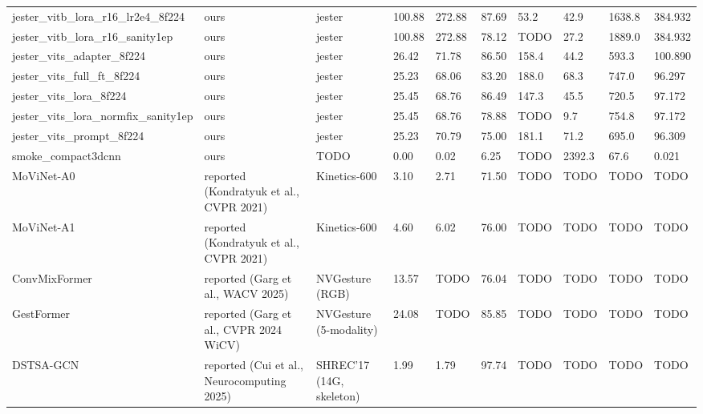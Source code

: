 \begin{tabular}{llllllllll}
jester\_vitb\_lora\_r16\_lr2e4\_8f224 & ours & jester & 100.88 & 272.88 & 87.69 & 53.2 & 42.9 & 1638.8 & 384.932 \\
jester\_vitb\_lora\_r16\_sanity1ep & ours & jester & 100.88 & 272.88 & 78.12 & TODO & 27.2 & 1889.0 & 384.932 \\
jester\_vits\_adapter\_8f224 & ours & jester & 26.42 & 71.78 & 86.50 & 158.4 & 44.2 & 593.3 & 100.890 \\
jester\_vits\_full\_ft\_8f224 & ours & jester & 25.23 & 68.06 & 83.20 & 188.0 & 68.3 & 747.0 & 96.297 \\
jester\_vits\_lora\_8f224 & ours & jester & 25.45 & 68.76 & 86.49 & 147.3 & 45.5 & 720.5 & 97.172 \\
jester\_vits\_lora\_normfix\_sanity1ep & ours & jester & 25.45 & 68.76 & 78.88 & TODO & 9.7 & 754.8 & 97.172 \\
jester\_vits\_prompt\_8f224 & ours & jester & 25.23 & 70.79 & 75.00 & 181.1 & 71.2 & 695.0 & 96.309 \\
smoke\_compact3dcnn & ours & TODO & 0.00 & 0.02 & 6.25 & TODO & 2392.3 & 67.6 & 0.021 \\
MoViNet-A0 & reported (Kondratyuk et al., CVPR 2021) & Kinetics-600 & 3.10 & 2.71 & 71.50 & TODO & TODO & TODO & TODO \\
MoViNet-A1 & reported (Kondratyuk et al., CVPR 2021) & Kinetics-600 & 4.60 & 6.02 & 76.00 & TODO & TODO & TODO & TODO \\
ConvMixFormer & reported (Garg et al., WACV 2025) & NVGesture (RGB) & 13.57 & TODO & 76.04 & TODO & TODO & TODO & TODO \\
GestFormer & reported (Garg et al., CVPR 2024 WiCV) & NVGesture (5-modality) & 24.08 & TODO & 85.85 & TODO & TODO & TODO & TODO \\
DSTSA-GCN & reported (Cui et al., Neurocomputing 2025) & SHREC'17 (14G, skeleton) & 1.99 & 1.79 & 97.74 & TODO & TODO & TODO & TODO \\
\hline
\end{tabular}
